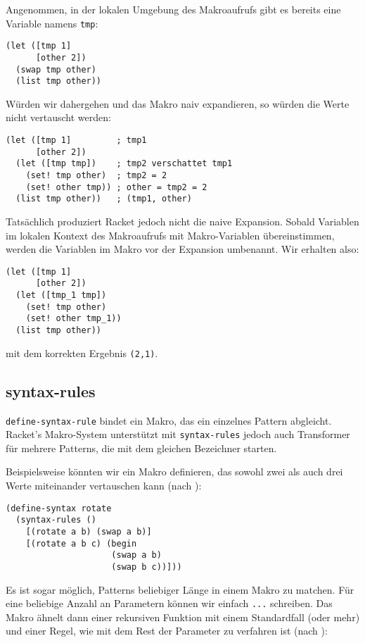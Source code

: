 Angenommen, in der lokalen Umgebung des Makroaufrufs gibt es bereits eine Variable namens \texttt{tmp}:

\begin{lstlisting}
(let ([tmp 1]
      [other 2])
  (swap tmp other)
  (list tmp other))
\end{lstlisting}

Würden wir dahergehen und das Makro naiv expandieren, so würden die Werte nicht vertauscht werden:

\begin{lstlisting}
(let ([tmp 1]         ; tmp1
      [other 2])
  (let ([tmp tmp])    ; tmp2 verschattet tmp1
    (set! tmp other)  ; tmp2 = 2
    (set! other tmp)) ; other = tmp2 = 2
  (list tmp other))   ; (tmp1, other)
\end{lstlisting}

Tatsächlich produziert Racket jedoch nicht die naive Expansion. Sobald Variablen im lokalen Kontext des Makroaufrufs mit Makro-Variablen übereinstimmen, werden die Variablen im Makro vor der Expansion umbenannt. Wir erhalten also:

\begin{lstlisting}
(let ([tmp 1]
      [other 2])
  (let ([tmp_1 tmp])
    (set! tmp other)
    (set! other tmp_1))
  (list tmp other))
\end{lstlisting}

mit dem korrekten Ergebnis \texttt{(2,1)}.

\subsection{syntax-rules}
\texttt{define-syntax-rule} bindet ein Makro, das ein einzelnes Pattern abgleicht. Racket's Makro-System unterstützt mit \texttt{syntax-rules} jedoch auch Transformer für mehrere Patterns, die mit dem gleichen Bezeichner starten.

Beispielsweise könnten wir ein Makro definieren, das sowohl zwei als auch drei Werte miteinander vertauschen kann (nach \cite{racketguide-macros}):

\begin{lstlisting}
(define-syntax rotate
  (syntax-rules ()
    [(rotate a b) (swap a b)]
    [(rotate a b c) (begin
                     (swap a b)
                     (swap b c))]))
\end{lstlisting}

Es ist sogar möglich, Patterns beliebiger Länge in einem Makro zu matchen. Für eine beliebige Anzahl an Parametern können wir einfach \texttt{...} schreiben. Das Makro ähnelt dann einer rekursiven Funktion mit einem Standardfall (oder mehr) und einer Regel, wie mit dem Rest der Parameter zu verfahren ist (nach \cite{racketguide-macros}):

